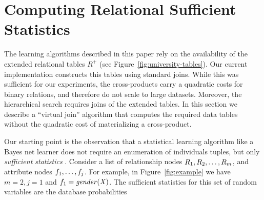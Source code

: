 \documentclass{article}
\begin{document}
%




\section{Computing Relational Sufficient Statistics} \label{sec:mobius}

The learning algorithms described in this paper rely on the  availability of the extended relational tables $R^{+}$ (see Figure~\ref{fig:university-tables}). Our current implementation constructs this tables using standard joins. While this was sufficient for our experiments, the cross-products carry a quadratic costs for binary relations, and therefore do not scale to large datasets. Moreover, the hierarchical search requires joins of the extended tables. In this section we describe a ``virtual join'' algorithm that computes the required data tables without the quadratic cost of materializing a cross-product. 

Our starting point is the observation that a statistical learning algorithm like a Bayes net learner does not require an enumeration of individuals tuples, but only {\em sufficient statistics} \cite{Heckerman1995,Schulte2011}. Consider a list of relationship nodes $R_{1}, R_{2},\ldots,R_{m}$, and attribute nodes $f_{1},\ldots,f_{j}$. For example, in Figure~\ref{fig:example} we have $m=2,j=1$ and $f_{1} = \it{gender}(X)$. The sufficient statistics for this set of random variables are the database probabilities
\end{document}

